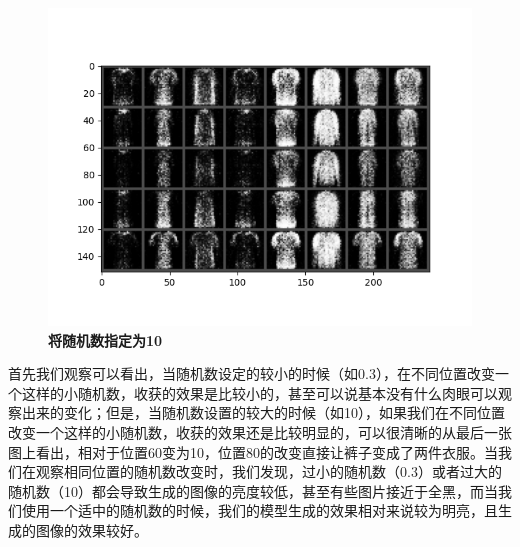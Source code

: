 \documentclass{article}
\begin{document}
\begin{figure}[H]
   \centering
   \includegraphics[scale = 0.5]{10.png}
   \caption{\textbf{将随机数指定为10}}
\end{figure}
首先我们观察可以看出，当随机数设定的较小的时候（如0.3），在不同位置改变一个这样的小随机数，收获的效果是比较小的，甚至可以说基本没有什么肉眼可以观察出来的变化；但是，当随机数设置的较大的时候（如10），如果我们在不同位置改变一个这样的小随机数，收获的效果还是比较明显的，可以很清晰的从最后一张图上看出，相对于位置60变为10，位置80的改变直接让裤子变成了两件衣服。当我们在观察相同位置的随机数改变时，我们发现，过小的随机数（0.3）或者过大的随机数（10）都会导致生成的图像的亮度较低，甚至有些图片接近于全黑，而当我们使用一个适中的随机数的时候，我们的模型生成的效果相对来说较为明亮，且生成的图像的效果较好。
\end{document}

